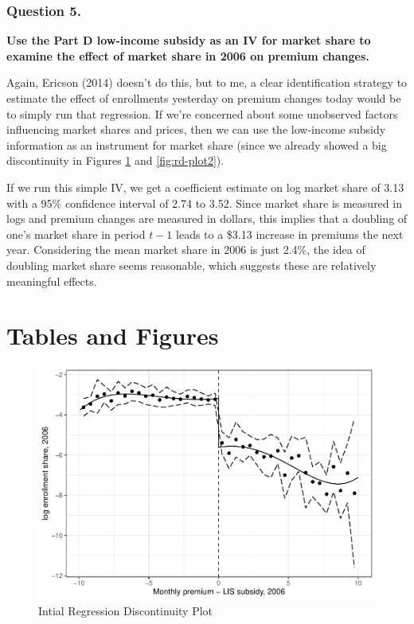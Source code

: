 \documentclass[
  12pt,
]{article}
\begin{document}
\hypertarget{question-5.}{%
\subsubsection{Question 5.}\label{question-5.}}

\textbf{Use the Part D low-income subsidy as an IV for market share to examine the effect of market share in 2006 on premium changes.}

Again, Ericson (2014) doesn't do this, but to me, a clear identification strategy to estimate the effect of enrollments yesterday on premium changes today would be to simply run that regression. If we're concerned about some unobserved factors influencing market shares and prices, then we can use the low-income subsidy information as an instrument for market share (since we already showed a big discontinuity in Figures \ref{fig:rd-plot1} and \ref{fig:rd-plot2}).

If we run this simple IV, we get a coefficient estimate on log market share of 3.13 with a 95\% confidence interval of 2.74 to 3.52. Since market share is measured in logs and premium changes are measured in dollars, this implies that a doubling of one's market share in period \(t-1\) leads to a \$3.13 increase in premiums the next year. Considering the mean market share in 2006 is just 2.4\%, the idea of doubling market share seems reasonable, which suggests these are relatively meaningful effects.

\newpage
{}

\hypertarget{tables-and-figures}{%
\section{Tables and Figures}\label{tables-and-figures}}

\begin{figure}
\centering
\includegraphics{solutions_files/figure-latex/rd-plot1-1.pdf}
\caption{\label{fig:rd-plot1}Intial Regression Discontinuity Plot}
\end{figure}
\end{document}
